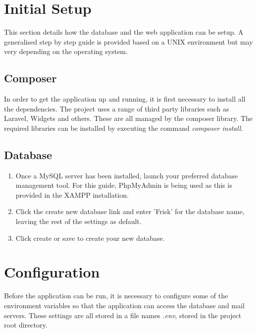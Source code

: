 \documentclass[12pt]{article}
\begin{document}
\section{Initial Setup}
This section details how the database and the web application can be setup. A generalised step by step guide is provided based on a UNIX environment but may very depending on the operating system.

\subsection{Composer}
In order to get the application up and running, it is first necessary to install all the dependencies. The project uses a range of third party libraries such as Laravel, Widgets and others. These are all managed by the composer library. The required libraries can be installed by executing the command \textit{composer install}.

\subsection{Database}
\begin{enumerate}
	\item Once a MySQL server has been installed, launch your preferred  database management tool. For this guide, PhpMyAdmin is being used as this is provided in the XAMPP installation.
	\item Click the create new database link and enter 'Frisk' for the database name, leaving the rest of the settings as default.
	\item Click create or save to create your new database.
\end{enumerate}

\section{Configuration}
Before the application can be run, it is necessary to configure some of the environment variables so that the application can access the database and mail servers. These settings are all stored in a file names \emph{.env}, stored in the project root directory.
\end{document}
